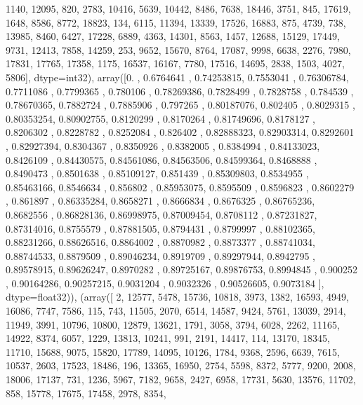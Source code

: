 \documentclass[letterpaper,10pt,english]{jupyterBook}
\begin{document}
\begin{sphinxVerbatim}[commandchars=\\\{\}]
          1140, 12095,   820,  2783, 10416,  5639, 10442,  8486,  7638,
         18446,  3751,   845, 17619,  1648,  8586,  8772, 18823,   134,
          6115, 11394, 13339, 17526, 16883,   875,  4739,   738, 13985,
          8460,  6427, 17228,  6889,  4363, 14301,  8563,  1457, 12688,
         15129, 17449,  9731, 12413,  7858, 14259,   253,  9652, 15670,
          8764, 17087,  9998,  6638,  2276,  7980, 17831, 17765, 17358,
          1175, 16537, 16167,  7780, 17516, 14695,  2838,  1503,  4027,
          5806], dtype=int32),
  array([0.        , 0.6764641 , 0.74253815, 0.7553041 , 0.76306784,
         0.7711086 , 0.7799365 , 0.780106  , 0.78269386, 0.7828499 ,
         0.7828758 , 0.784539  , 0.78670365, 0.7882724 , 0.7885906 ,
         0.797265  , 0.80187076, 0.802405  , 0.8029315 , 0.80353254,
         0.80902755, 0.8120299 , 0.8170264 , 0.81749696, 0.8178127 ,
         0.8206302 , 0.8228782 , 0.8252084 , 0.826402  , 0.82888323,
         0.82903314, 0.8292601 , 0.82927394, 0.8304367 , 0.8350926 ,
         0.8382005 , 0.8384994 , 0.84133023, 0.8426109 , 0.84430575,
         0.84561086, 0.84563506, 0.84599364, 0.8468888 , 0.8490473 ,
         0.8501638 , 0.85109127, 0.851439  , 0.85309803, 0.8534955 ,
         0.85463166, 0.8546634 , 0.856802  , 0.85953075, 0.8595509 ,
         0.8596823 , 0.8602279 , 0.861897  , 0.86335284, 0.8658271 ,
         0.8666834 , 0.8676325 , 0.86765236, 0.8682556 , 0.86828136,
         0.86998975, 0.87009454, 0.8708112 , 0.87231827, 0.87314016,
         0.8755579 , 0.87881505, 0.8794431 , 0.8799997 , 0.88102365,
         0.88231266, 0.88626516, 0.8864002 , 0.8870982 , 0.8873377 ,
         0.88741034, 0.88744533, 0.8879509 , 0.89046234, 0.8919709 ,
         0.89297944, 0.8942795 , 0.89578915, 0.89626247, 0.8970282 ,
         0.89725167, 0.89876753, 0.8994845 , 0.900252  , 0.90164286,
         0.90257215, 0.9031204 , 0.9032326 , 0.90526605, 0.9073184 ],
        dtype=float32)),
 (array([    2, 12577,  5478, 15736, 10818,  3973,  1382, 16593,  4949,
         16086,  7747,  7586,   115,   743, 11505,  2070,  6514, 14587,
          9424,  5761, 13039,  2914, 11949,  3991, 10796, 10800, 12879,
         13621,  1791,  3058,  3794,  6028,  2262, 11165, 14922,  8374,
          6057,  1229, 13813, 10241,   991,  2191, 14417,   114, 13170,
         18345, 11710, 15688,  9075, 15820, 17789, 14095, 10126,  1784,
          9368,  2596,  6639,  7615, 10537,  2603, 17523, 18486,   196,
         13365, 16950,  2754,  5598,  8372,  5777,  9200,  2008, 18006,
         17137,   731,  1236,  5967,  7182,  9658,  2427,  6958, 17731,
          5630, 13576, 11702,   858, 15778, 17675, 17458,  2978,  8354,

\end{sphinxVerbatim}
\end{document}
